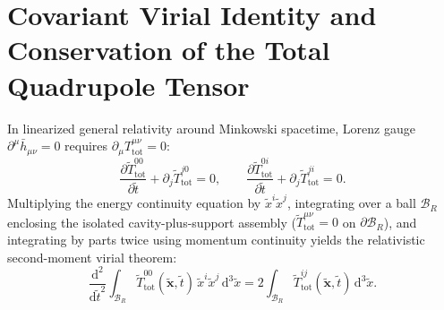 \documentclass[aps,prd,twocolumn,10pt,showkeys,nofootinbib,floatfix,longbibliography]{revtex4-2}
\newcommand{\dd}{\mathrm{d}}
\begin{document}
\appendix

\section{Covariant Virial Identity and Conservation of the Total Quadrupole Tensor}
\label{app:virial}

In linearized general relativity around Minkowski spacetime, Lorenz gauge $\partial^\mu \bar{h}_{\mu\nu} = 0$ requires $\partial_\mu T^{\mu\nu}_{\mathrm{tot}} = 0$:
\begin{equation}
\frac{\partial \tilde{T}^{00}_{\mathrm{tot}}}{\partial \tilde{t}} + \partial_j \tilde{T}^{j0}_{\mathrm{tot}} = 0, \qquad \frac{\partial \tilde{T}^{0i}_{\mathrm{tot}}}{\partial \tilde{t}} + \partial_j \tilde{T}^{ji}_{\mathrm{tot}} = 0.
\label{eq:app_continuity}
\end{equation}
Multiplying the energy continuity equation by $\tilde{x}^i\tilde{x}^j$, integrating over a ball $\mathcal{B}_R$ enclosing the isolated cavity-plus-support assembly ($\tilde{T}^{\mu\nu}_{\mathrm{tot}} = 0$ on $\partial\mathcal{B}_R$), and integrating by parts twice using momentum continuity yields the relativistic second-moment virial theorem:
\begin{equation}
\frac{\dd^2}{\dd\tilde{t}^2} \int_{\mathcal{B}_R} \tilde{T}^{00}_{\mathrm{tot}}(\tilde{\mathbf{x}}, \tilde{t}) \, \tilde{x}^i \tilde{x}^j \, \dd^3\tilde{x} = 2 \int_{\mathcal{B}_R} \tilde{T}^{ij}_{\mathrm{tot}}(\tilde{\mathbf{x}}, \tilde{t}) \, \dd^3\tilde{x}.
\label{eq:app_virial}
\end{equation}
\end{document}
